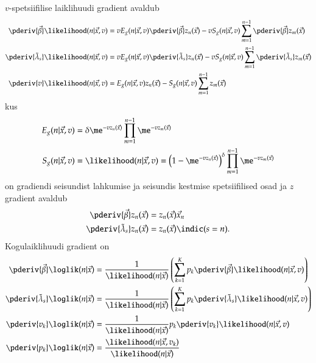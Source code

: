 \documentclass[a4paper]{article}
\numberwithin{equation}{subsection}
\begin{document}
$v$-spetsiifilise laiklihuudi gradient avaldub
\begin{align}
  \pderiv{\vec{\beta}} \likelihood(n|\vec{x}, v) 
  &=
  v E_g(n|\vec{x}, v) \pderiv{\vec{\beta}} z_n(\vec{x}) -
  v S_g(n|\vec{x}, v) \sum_{m=1}^{n-1} \pderiv{\vec{\beta}} z_m(\vec{x})\\
  \pderiv{\tilde\lambda_s} \likelihood(n|\vec{x}, v) 
  &=
  v E_g(n|\vec{x}, v) \pderiv{\tilde\lambda_s} z_n(\vec{x}) -
  v S_g(n|\vec{x}, v) \sum_{m=1}^{n-1} \pderiv{\tilde\lambda_s} z_m(\vec{x})\\
  \pderiv{v} \likelihood(n|\vec{x}, v) 
  &=
  E_g(n|\vec{x}, v) z_n(\vec{x}) -
  S_g(n|\vec{x}, v) \sum_{m=1}^{n-1} z_m(\vec{x})
\end{align}
kus
\begin{align}
  E_g(n|\vec{x}, v) 
  &=
  \delta \me^{-v z_n(\vec{x})} \prod_{m=1}^{n-1} \me^{-v z_m(\vec{x})}\\
  S_g(n|\vec{x}, v)
  &= 
  \likelihood(n|\vec{x}, v) =
  \left(
    1 - \me^{-v z_n(\vec{x})}
  \right)^\delta
  \prod_{m=1}^{n-1} \me^{-v z_m(\vec{x})}
\end{align}
on gradiendi seisundist lahkumise ja seisundis kestmise spetsiifilised
osad ja $z$ gradient avaldub
\begin{align}
  \pderiv{\vec{\beta}} z_n(\vec{x})
  &=
  z_n(\vec{x}) \vec{x}_n\\
  \pderiv{\tilde\lambda_s} z_n(\vec{x})
  &=
  z_n(\vec{x}) \indic(s = n).
\end{align}
Kogulaiklihuudi gradient on
\begin{align}
  \pderiv{\vec{\beta}} \loglik(n|\vec{x}) 
  &=
  \frac{1}{\likelihood(n|\vec{x})}
  \left(
    \sum_{k=1}^K p_k \pderiv{\vec{\beta}} \likelihood(n|\vec{x}, v)
  \right)\\
  \pderiv{\tilde\lambda_s} \loglik(n|\vec{x}) 
  &=
  \frac{1}{\likelihood(n|\vec{x})}
  \left(
    \sum_{k=1}^K p_k \pderiv{\tilde\lambda_s} \likelihood(n|\vec{x}, v)
  \right)\\
  \pderiv{v_k} \loglik(n|\vec{x}) 
  &=
  \frac{1}{\likelihood(n|\vec{x})}
  p_k \pderiv{v_k} \likelihood(n|\vec{x}, v)\\
  \pderiv{p_k} \loglik(n|\vec{x}) 
  &=
  \frac{\likelihood(n|\vec{x}, v_k)}{\likelihood(n|\vec{x})}
\end{align}
\end{document}
